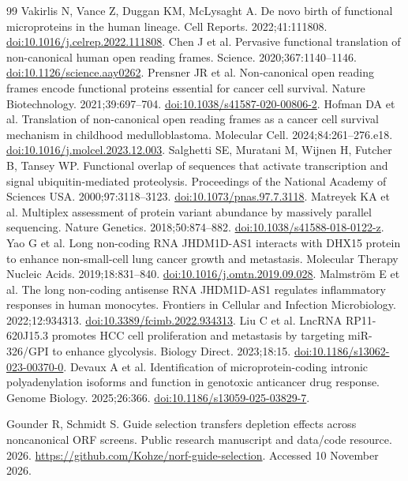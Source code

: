 \documentclass[11pt,a4paper]{article}
\begin{document}
\begin{thebibliography}{99}
 Vakirlis N, Vance Z, Duggan KM, McLysaght A. De novo birth of functional microproteins in the human lineage. Cell Reports. 2022;41:111808. \href{https://doi.org/10.1016/j.celrep.2022.111808}{doi:10.1016/j.celrep.2022.111808}.
 Chen J et al. Pervasive functional translation of non-canonical human open reading frames. Science. 2020;367:1140--1146. \href{https://doi.org/10.1126/science.aay0262}{doi:10.1126/science.aay0262}.
 Prensner JR et al. Non-canonical open reading frames encode functional proteins essential for cancer cell survival. Nature Biotechnology. 2021;39:697--704. \href{https://doi.org/10.1038/s41587-020-00806-2}{doi:10.1038/s41587-020-00806-2}.
 Hofman DA et al. Translation of non-canonical open reading frames as a cancer cell survival mechanism in childhood medulloblastoma. Molecular Cell. 2024;84:261--276.e18. \href{https://doi.org/10.1016/j.molcel.2023.12.003}{doi:10.1016/j.molcel.2023.12.003}.
 Salghetti SE, Muratani M, Wijnen H, Futcher B, Tansey WP. Functional overlap of sequences that activate transcription and signal ubiquitin-mediated proteolysis. Proceedings of the National Academy of Sciences USA. 2000;97:3118--3123. \href{https://doi.org/10.1073/pnas.97.7.3118}{doi:10.1073/pnas.97.7.3118}.
 Matreyek KA et al. Multiplex assessment of protein variant abundance by massively parallel sequencing. Nature Genetics. 2018;50:874--882. \href{https://doi.org/10.1038/s41588-018-0122-z}{doi:10.1038/s41588-018-0122-z}.
 Yao G et al. Long non-coding RNA JHDM1D-AS1 interacts with DHX15 protein to enhance non-small-cell lung cancer growth and metastasis. Molecular Therapy Nucleic Acids. 2019;18:831--840. \href{https://doi.org/10.1016/j.omtn.2019.09.028}{doi:10.1016/j.omtn.2019.09.028}.
 Malmstr{\"o}m E et al. The long non-coding antisense RNA JHDM1D-AS1 regulates inflammatory responses in human monocytes. Frontiers in Cellular and Infection Microbiology. 2022;12:934313. \href{https://doi.org/10.3389/fcimb.2022.934313}{doi:10.3389/fcimb.2022.934313}.
 Liu C et al. LncRNA RP11-620J15.3 promotes HCC cell proliferation and metastasis by targeting miR-326/GPI to enhance glycolysis. Biology Direct. 2023;18:15. \href{https://doi.org/10.1186/s13062-023-00370-0}{doi:10.1186/s13062-023-00370-0}.
 Devaux A et al. Identification of microprotein-coding intronic polyadenylation isoforms and function in genotoxic anticancer drug response. Genome Biology. 2025;26:366. \href{https://doi.org/10.1186/s13059-025-03829-7}{doi:10.1186/s13059-025-03829-7}.


 Gounder R, Schmidt S. Guide selection transfers depletion effects across noncanonical ORF screens. Public research manuscript and data/code resource. 2026. \url{https://github.com/Kohze/norf-guide-selection}. Accessed 10 November 2026.
\end{thebibliography}
\endgroup
\end{document}
